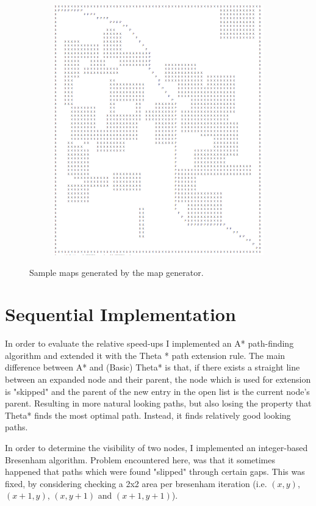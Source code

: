 \documentclass{article}
\begin{document}
\begin{figure}[h]
\begin{subfigure}[b]{0.49\textwidth}
        \includegraphics[width=\textwidth]{figures/map_4.png}
    \end{subfigure}
    \hfill
    \caption{Sample maps generated by the map generator.}
    \label{fig:map_gen}
\end{figure}
%
\section{Sequential Implementation}
%
In order to evaluate the relative speed-ups I implemented an A* path-finding algorithm and extended it with the Theta * path extension rule. The main difference between A* and (Basic) Theta* is that, if there exists a straight line between an expanded node and their parent, the node which is used for extension is "skipped" and the parent of the new entry in the open list is the current node's parent. Resulting in more natural looking paths, but also losing the property that Theta* finds the most optimal path. Instead, it finds relatively good looking paths.

In order to determine the visibility of two nodes, I implemented an integer-based Bresenham algorithm. Problem encountered here, was that it sometimes happened that paths which were found "slipped" through certain gaps. This was fixed, by considering checking a 2x2 area per bresenham iteration (i.e. $(x,y)$, $(x+1,y)$, $(x,y+1)$ and $(x+1,y+1)$).
\end{document}
